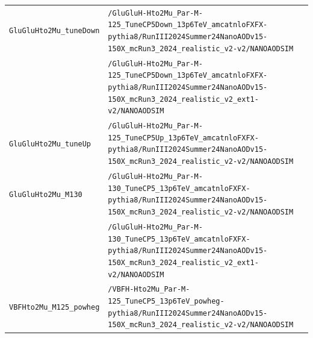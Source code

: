\begin{longtable}{@{}>{\RaggedRight\arraybackslash}p{} >{\RaggedRight\arraybackslash}p{}@{}}
\addlinespace[2pt]
\texttt{GluGluHto2Mu\_\allowbreak{}tuneDown} & \texttt{/\allowbreak{}GluGluH-\allowbreak{}Hto2Mu\_\allowbreak{}Par-\allowbreak{}M-\allowbreak{}125\_\allowbreak{}TuneCP5Down\_\allowbreak{}13p6TeV\_\allowbreak{}amcatnloFXFX-\allowbreak{}pythia8/\allowbreak{}RunIII2024Summer24NanoAODv15-\allowbreak{}150X\_\allowbreak{}mcRun3\_\allowbreak{}2024\_\allowbreak{}realistic\_\allowbreak{}v2-\allowbreak{}v2/\allowbreak{}NANOAODSIM} \\
 & \texttt{/\allowbreak{}GluGluH-\allowbreak{}Hto2Mu\_\allowbreak{}Par-\allowbreak{}M-\allowbreak{}125\_\allowbreak{}TuneCP5Down\_\allowbreak{}13p6TeV\_\allowbreak{}amcatnloFXFX-\allowbreak{}pythia8/\allowbreak{}RunIII2024Summer24NanoAODv15-\allowbreak{}150X\_\allowbreak{}mcRun3\_\allowbreak{}2024\_\allowbreak{}realistic\_\allowbreak{}v2\_\allowbreak{}ext1-\allowbreak{}v2/\allowbreak{}NANOAODSIM} \\
\addlinespace[2pt]
\texttt{GluGluHto2Mu\_\allowbreak{}tuneUp} & \texttt{/\allowbreak{}GluGluH-\allowbreak{}Hto2Mu\_\allowbreak{}Par-\allowbreak{}M-\allowbreak{}125\_\allowbreak{}TuneCP5Up\_\allowbreak{}13p6TeV\_\allowbreak{}amcatnloFXFX-\allowbreak{}pythia8/\allowbreak{}RunIII2024Summer24NanoAODv15-\allowbreak{}150X\_\allowbreak{}mcRun3\_\allowbreak{}2024\_\allowbreak{}realistic\_\allowbreak{}v2-\allowbreak{}v2/\allowbreak{}NANOAODSIM} \\
\addlinespace[2pt]
\texttt{GluGluHto2Mu\_\allowbreak{}M130} & \texttt{/\allowbreak{}GluGluH-\allowbreak{}Hto2Mu\_\allowbreak{}Par-\allowbreak{}M-\allowbreak{}130\_\allowbreak{}TuneCP5\_\allowbreak{}13p6TeV\_\allowbreak{}amcatnloFXFX-\allowbreak{}pythia8/\allowbreak{}RunIII2024Summer24NanoAODv15-\allowbreak{}150X\_\allowbreak{}mcRun3\_\allowbreak{}2024\_\allowbreak{}realistic\_\allowbreak{}v2-\allowbreak{}v2/\allowbreak{}NANOAODSIM} \\
 & \texttt{/\allowbreak{}GluGluH-\allowbreak{}Hto2Mu\_\allowbreak{}Par-\allowbreak{}M-\allowbreak{}130\_\allowbreak{}TuneCP5\_\allowbreak{}13p6TeV\_\allowbreak{}amcatnloFXFX-\allowbreak{}pythia8/\allowbreak{}RunIII2024Summer24NanoAODv15-\allowbreak{}150X\_\allowbreak{}mcRun3\_\allowbreak{}2024\_\allowbreak{}realistic\_\allowbreak{}v2\_\allowbreak{}ext1-\allowbreak{}v2/\allowbreak{}NANOAODSIM} \\
\addlinespace[2pt]
\texttt{VBFHto2Mu\_\allowbreak{}M125\_\allowbreak{}powheg} & \texttt{/\allowbreak{}VBFH-\allowbreak{}Hto2Mu\_\allowbreak{}Par-\allowbreak{}M-\allowbreak{}125\_\allowbreak{}TuneCP5\_\allowbreak{}13p6TeV\_\allowbreak{}powheg-\allowbreak{}pythia8/\allowbreak{}RunIII2024Summer24NanoAODv15-\allowbreak{}150X\_\allowbreak{}mcRun3\_\allowbreak{}2024\_\allowbreak{}realistic\_\allowbreak{}v2-\allowbreak{}v2/\allowbreak{}NANOAODSIM} \\

\end{longtable}
